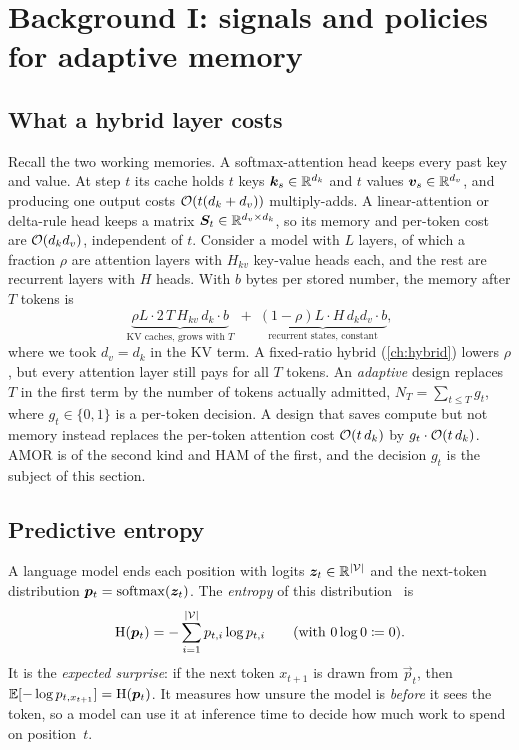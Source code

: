 \section{Background I: signals and policies for adaptive memory}\label{sec:c13-signals}

\subsection{What a hybrid layer costs}\label{sec:c13-cost}

Recall the two working memories. A softmax-attention head keeps every past key and value. At step
$t$ its cache holds $t$ keys $\bm{k}_s\in\mathbb{R}^{d_k}$ and $t$ values $\bm{v}_s\in\mathbb{R}^{d_v}$, and producing one
output costs $\mathcal{O}(t(d_k+d_v))$ multiply-adds. A linear-attention or delta-rule head keeps a matrix
$\bm{S}_t\in\mathbb{R}^{d_v\times d_k}$, so its memory and per-token cost are $\mathcal{O}(d_kd_v)$, independent of $t$.
Consider a model with $L$ layers, of which a fraction $\rho$ are attention layers with $H_{kv}$ key-value
heads each, and the rest are recurrent layers with $H$ heads. With $b$ bytes per stored number, the
memory after $T$ tokens is
\begin{equation}\label{eq:c13-hybrid-mem}
  \underbrace{\rho L \cdot 2\,T\,H_{kv}\,d_k\cdot b}_{\text{KV caches, grows with }T}
  \;+\; \underbrace{(1-\rho)L\cdot H\,d_k d_v\cdot b}_{\text{recurrent states, constant}},
\end{equation}
where we took $d_v=d_k$ in the KV term. A fixed-ratio hybrid (\cref{ch:hybrid}) lowers $\rho$, but
every attention layer still pays for all $T$ tokens. An \emph{adaptive} design replaces $T$ in the
first term by the number of tokens actually admitted, $N_T=\sum_{t\le T} g_t$, where $g_t\in\{0,1\}$ is
a per-token decision. A design that saves compute but not memory instead replaces the per-token
attention cost $\mathcal{O}(t\,d_k)$ by $g_t\cdot\mathcal{O}(t\,d_k)$. AMOR is of the second kind and HAM of the
first, and the decision $g_t$ is the subject of this section.

\subsection{Predictive entropy}\label{sec:c13-entropy}

A language model ends each position with logits $\bm{z}_t\in\mathbb{R}^{\left\lvert \mathcal{V}\right\rvert}$ and the next-token
distribution $\bm{p}_t=\operatorname{softmax}(\bm{z}_t)$. The \emph{entropy} of this distribution~\citep{c13-shannon1948} is
\begin{equation}\label{eq:c13-entropy}
  \mathrm{H}(\bm{p}_t) = -\sum_{i=1}^{\left\lvert \mathcal{V}\right\rvert} p_{t,i}\log p_{t,i}
  \qquad(\text{with } 0\log 0 \coloneqq 0).
\end{equation}
It is the \emph{expected surprise}: if the next token $x_{t+1}$ is drawn from $\vec{p}_t$, then
$\mathbb{E}[-\log p_{t,x_{t+1}}]=\mathrm{H}(\bm{p}_t)$. It measures how unsure the model is \emph{before} it sees
the token, so a model can use it at inference time to decide how much work to spend on position~$t$.

